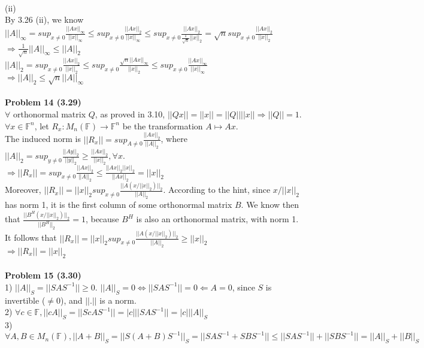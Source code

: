 \documentclass[letterpaper,12pt]{article}
\theoremstyle{definition}
\begin{document}
\\
(ii)\\
By 3.26 (ii), we know \\
$||A||_{\infty} = sup_{x\neq 0}\frac{||Ax||_{\infty}}{||x||_{\infty}} \leq sup_{x\neq 0}
\frac{||Ax||_2}{||x||_{\infty}}\leq  sup_{x\neq 0}
\frac{||Ax||_2}{\frac{1}{\sqrt{n}}||x||_2}=\sqrt{n}sup_{x\neq 0}\frac{||Ax||_2}{||x||_2}$\\
$\Rightarrow \frac{1}{\sqrt{n}}||A||_{\infty} \leq ||A||_2$\\
$||A||_2 = sup_{x\neq 0}\frac{||Ax||_2}{||x||_2} \leq sup_{x\neq 0}\frac{\sqrt{n}||Ax||_{\infty}}{||x||_2} \leq sup_{x\neq 0}\frac{||Ax||_{\infty}}{||x||_{\infty}}$\\
$\Rightarrow ||A||_2\leq \sqrt{n}||A||_{\infty}$\\
\\
\noindent\textbf{Problem 14 (3.29)}\\
$\forall$ orthonormal matrix $Q$, as proved in 3.10, $||Qx|| = ||x||=||Q||||x||\Rightarrow ||Q|| = 1$.
$\forall x\in \mathbb{F}^n$, let $R_x: M_n(\mathbb{F})\rightarrow \mathbb{F}^n$ be the transformation $A\mapsto Ax$.\\
The induced norm is $||R_x|| = sup_{A\neq 0}\frac{||Ax||_2}{||A||_2}$, where $||A||_2=sup_{y\neq 0}\frac{||Ay||_2}{||y||_2}\geq \frac{||Ax||_2}{||x||_2}, \forall x$.\\
$\Rightarrow ||R_x|| = sup_{x\neq 0}\frac{||Ax||_2}{||A||_2}\leq \frac{||Ax||_2||x||_2}{||Ax||_2} = ||x||_2$\\
Moreover, $||R_x|| = ||x||_2sup_{x\neq 0}\frac{||A(x/||x||_2)||_2}{||A||_2}$. According to the hint, since $x/||x||_2$ has norm 1, it is the first column of some orthonormal matrix $B$. We know then that $\frac{||B^H(x/||x||_2)||_2}{||B^H||_2} = 1$, because $B^H$ is also an orthonormal matrix, with norm 1. It follows that $||R_x|| = ||x||_2sup_{x\neq 0}\frac{||A(x/||x||_2)||_2}{||A||_2}\geq ||x||_2$\\
$\Rightarrow ||R_x|| = ||x||_2$\\
\\
\noindent\textbf{Problem 15 (3.30)}\\
1) $||A||_S = ||SAS^{-1}|| \geq 0$. $||A||_S = 0\Leftrightarrow ||SAS^{-1}|| = 0\Leftarrow A = 0$, since $S$ is invertible ($\neq 0$), and $||.||$ is a norm.\\
2) $\forall c\in \mathbb{F}, ||cA||_S = ||ScAS^{-1}|| = |c|||SAS^{-1}|| = |c| ||A||_S$\\
3) $\forall A, B \in M_n(\mathbb{F}), ||A+B||_S = ||S(A+B)S^{-1}||_S = ||SAS^{-1}+SBS^{-1}||\leq ||SAS^{-1}||+||SBS^{-1}|| =||A||_S + ||B||_S $\\
\end{document}

